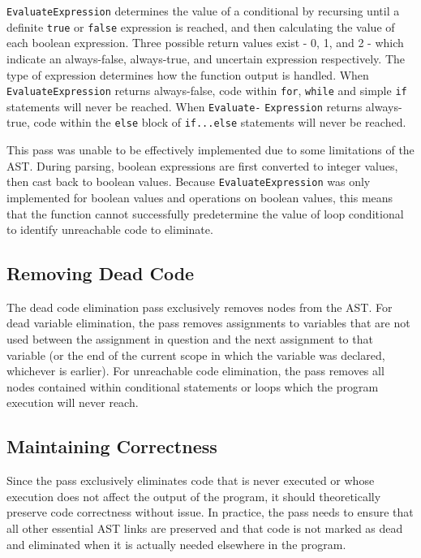 \documentclass[sigconf]{acmart}
\begin{document}
\verb|EvaluateExpression| determines the value of a conditional by recursing until a definite \verb|true| or \verb|false| expression is reached, and then calculating the value of each boolean expression. Three possible return values exist - 0, 1, and 2 - which indicate an always-false, always-true, and uncertain expression respectively. The type of expression determines how the function output is handled. When \verb|EvaluateExpression| returns always-false, code within \verb|for|, \verb|while| and simple \verb|if| statements will never be reached. When \verb|Evaluate-| \verb|Expression| returns always-true, code within the \verb|else| block of \verb|if...else| statements will never be reached.

This pass was unable to be effectively implemented due to some limitations of the AST. During parsing, boolean expressions are first converted to integer values, then cast back to boolean values. Because \verb|EvaluateExpression| was only implemented for boolean values and operations on boolean values, this means that the function cannot successfully predetermine the value of loop conditional to identify unreachable code to eliminate.

\subsection{Removing Dead Code}
The dead code elimination pass exclusively removes nodes from the AST. For dead variable elimination, the pass removes assignments to variables that are not used between the assignment in question and the next assignment to that variable (or the end of the current scope in which the variable was declared, whichever is earlier). For unreachable code elimination, the pass removes all nodes contained within conditional statements or loops which the program execution will never reach.

\subsection{Maintaining Correctness}
Since the pass exclusively eliminates code that is never executed or whose execution does not affect the output of the program, it should theoretically preserve code correctness without issue. In practice, the pass needs to ensure that all other essential AST links are preserved and that code is not marked as dead and eliminated when it is actually needed elsewhere in the program.
\end{document}
